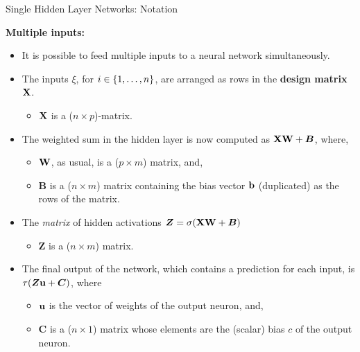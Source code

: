\documentclass[11pt,compress,t,notes=noshow, xcolor=table]{beamer}
\begin{document}
\begin{vbframe}{Single Hidden Layer Networks: Notation}
\framebreak 

  \textbf{%
  Multiple inputs:}
  \begin{itemize}
    \item It is possible to feed multiple inputs to a neural network simultaneously.
    \vspace{2mm}
    \item The inputs $\xi$, for $i \in \{1, \ldots, n\}$, are arranged as rows in the \textbf{design matrix} $\mathbf{X}$.
    \begin{itemize}
      \item $\mathbf{X}$ is a ($n \times p$)-matrix.
    \end{itemize}
    \vspace{2mm}
    \item The weighted sum in the hidden layer is now computed as $\mathbf{X}\mathbf{W} + \bm{B}$, where,
      \begin{itemize}
        \item $\mathbf{W}$, as usual, is a ($p \times m$) matrix, and,
        \vspace{2mm}
        \item $\bm{B}$ is a ($n \times m$) matrix containing the bias vector $\mathbf{b}$ (duplicated) as the rows of the matrix.
      \end{itemize}
    \vspace{2mm}
    \item The \textit{matrix} of hidden activations $\bm{Z} = \sigma(\mathbf{X}\mathbf{W} + \bm{B})$
    \begin{itemize}
      \item $\bm{Z}$ is a ($n \times m$) matrix.
    \end{itemize}
  \end{itemize}

\framebreak

  \begin{itemize}
    \vspace{15mm}
    \item The final output of the network, which contains a prediction for each input, is $\tau(\bm{Z}\mathbf{u} + \bm{C})$, where
      \begin{itemize}
        \vspace{2mm}
        \item $\mathbf{u}$ is the vector of weights of the output neuron, and,
        \vspace{2mm}
        \item $\bm{C}$ is a ($n \times 1$) matrix whose elements are the (scalar) bias $c$ of the output neuron.
      \end{itemize}
  \end{itemize}
\end{vbframe}
\endlecture
\end{document}
